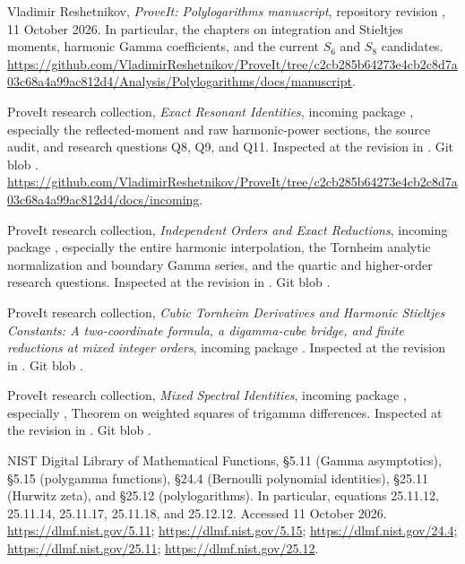 Vladimir Reshetnikov, \emph{ProveIt: Polylogarithms manuscript},
repository revision
, 11 October 2026.
In particular, the chapters on integration and Stieltjes moments,
harmonic Gamma coefficients, and the current $S_6$ and $S_8$ candidates.
\url{https://github.com/VladimirReshetnikov/ProveIt/tree/c2cb285b64273e4cb2c8d7a03c68a4a99ac812d4/Analysis/Polylogarithms/docs/manuscript}.

ProveIt research collection, \emph{Exact Resonant Identities},
incoming package ,
especially the reflected-moment and raw harmonic-power sections,
the source audit, and research questions Q8, Q9, and Q11.
Inspected at the revision in \cite{source:manuscript}.
Git blob .
\url{https://github.com/VladimirReshetnikov/ProveIt/tree/c2cb285b64273e4cb2c8d7a03c68a4a99ac812d4/docs/incoming}.

ProveIt research collection, \emph{Independent Orders and Exact Reductions},
incoming package ,
especially the entire harmonic interpolation, the Tornheim analytic
normalization and boundary Gamma series, and the quartic and higher-order
research questions. Inspected at the revision in \cite{source:manuscript}.
Git blob .

ProveIt research collection, \emph{Cubic Tornheim Derivatives and Harmonic
Stieltjes Constants: A two-coordinate formula, a digamma-cube bridge,
and finite reductions at mixed integer orders},
incoming package .
Inspected at the revision in \cite{source:manuscript}.
Git blob .

ProveIt research collection, \emph{Mixed Spectral Identities},
incoming package ,
especially , Theorem
 on weighted squares of trigamma differences.
Inspected at the revision in \cite{source:manuscript}.
Git blob .

NIST Digital Library of Mathematical Functions,
\S5.11 (Gamma asymptotics), \S5.15 (polygamma functions),
\S24.4 (Bernoulli polynomial identities),
\S25.11 (Hurwitz zeta), and \S25.12 (polylogarithms).
In particular, equations 25.11.12, 25.11.14, 25.11.17,
25.11.18, and 25.12.12. Accessed 11 October 2026.
\url{https://dlmf.nist.gov/5.11};
\url{https://dlmf.nist.gov/5.15};
\url{https://dlmf.nist.gov/24.4};
\url{https://dlmf.nist.gov/25.11};
\url{https://dlmf.nist.gov/25.12}.

